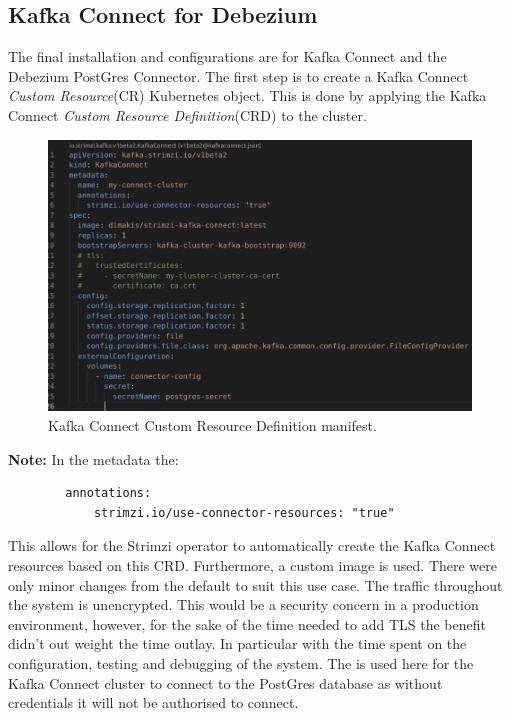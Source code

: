 \begin{flushleft}
    \subsection{Kafka Connect for Debezium}
    The final installation and configurations are for Kafka Connect and the Debezium PostGres Connector. The first step is to create a Kafka Connect \emph{Custom Resource}(CR)
    Kubernetes object. This is done by applying the Kafka Connect \emph{Custom Resource Definition}(CRD) to the cluster.
    \begin{figure} [ht]
        \begin{center}
            \includegraphics[width=1\textwidth]{figures/kafka-connect-manifest.png}
            \caption{Kafka Connect Custom Resource Definition manifest.}
            \label{fig: 2.13}
        \end{center}
    \end{figure}
    \newline \textbf{Note:} In the metadata the:
    \begin{lstlisting}
        annotations:
            strimzi.io/use-connector-resources: "true"
    \end{lstlisting}
    This allows for the Strimzi operator to automatically create the Kafka Connect resources based on this CRD.\newline
    Furthermore, a custom image is used. There were only minor changes from the default to suit this use case. \newline
    The traffic throughout the system is unencrypted. This would be a security concern in a production environment, however, for the sake of the time needed to
    add TLS the benefit didn't out weight the time outlay. In particular with the time spent on the configuration, testing and debugging of the system.\newline
    The  is used here for the Kafka Connect cluster to connect to the PostGres database as without credentials it will not be authorised to connect.

\end{flushleft}
